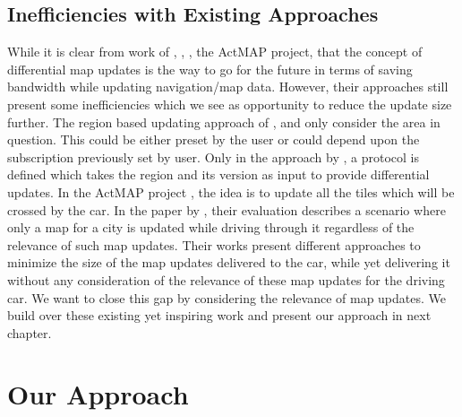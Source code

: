 

\section{Inefficiencies with Existing Approaches}
While it is clear from work of \citet{min2008mobile}, \citet{cooper2001incremental}, \citet{asahara2008locally}, the ActMAP project\cite{flament2003actmap}, \citet{fischer2012technique} that the concept of differential map updates is the way to go for the future in terms of saving bandwidth while updating navigation/map data. However, their approaches still present some inefficiencies which we see as opportunity to reduce the update size further. The region based updating approach of \citet{asahara2008locally}, \citet{min2008mobile} and \citet{fischer2012technique} only consider the area in question. This could be either preset by the user or could depend upon the subscription previously set by user. Only in the approach by \citet{min2011system}, a protocol is defined which takes the region and its version as input to provide differential updates. In the ActMAP project \cite{flament2003actmap}, the idea is to update all the tiles which will be crossed by the car. In the paper by \citet{bastiaensen2003actmap}, their evaluation describes a scenario where only a map for a city is updated while driving through it regardless of the relevance of such map updates. Their works present different approaches to minimize the size of the map updates delivered to the car, while yet delivering it without any consideration of the relevance of these map updates for the driving car. We want to close this gap by considering the relevance of map updates. We build over these existing yet inspiring work and present our approach in next chapter.     


\chapter{Our Approach}\label{ch:approach}
